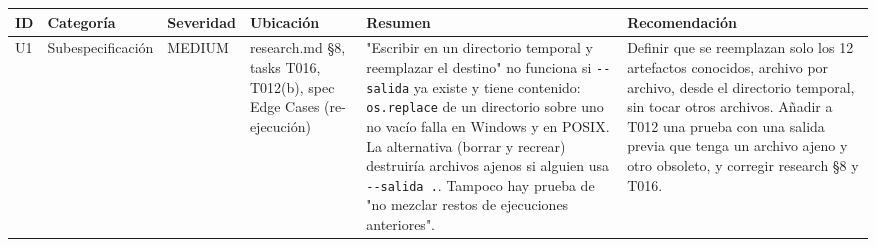 \documentclass[12pt,a4paper]{article}
\newcounter{none} %
\newenvironment{documentogenerado}[2]{%
  \def\doccomando{#1}\def\docruta{#2}%
  \par\begingroup\small\setstretch{1.15}\sloppy%
}{\endgroup\par\medskip}
\begin{document}
\begin{documentogenerado}{/speckit-analyze}{specs\slash 001-preparacion-datos\slash analisis-inicial.md}
{\def\LTcaptype{none} %
{\footnotesize
\begin{longtable}[]{@{}
  >{\raggedright\arraybackslash\hspace{0pt}}p{}
  >{\raggedright\arraybackslash\hspace{0pt}}p{}
  >{\raggedright\arraybackslash\hspace{0pt}}p{}
  >{\raggedright\arraybackslash\hspace{0pt}}p{}
  >{\raggedright\arraybackslash\hspace{0pt}}p{}
  >{\raggedright\arraybackslash\hspace{0pt}}p{}@{}}
\toprule\noalign{}
\begin{minipage}[b]{\linewidth}\raggedright
ID
\end{minipage} & \begin{minipage}[b]{\linewidth}\raggedright
Categoría
\end{minipage} & \begin{minipage}[b]{\linewidth}\raggedright
Severidad
\end{minipage} & \begin{minipage}[b]{\linewidth}\raggedright
Ubicación
\end{minipage} & \begin{minipage}[b]{\linewidth}\raggedright
Resumen
\end{minipage} & \begin{minipage}[b]{\linewidth}\raggedright
Recomendación
\end{minipage} \\
\midrule\noalign{}
\endhead
\bottomrule\noalign{}
\endlastfoot
U1 & Subespecificación & MEDIUM & research.md §8, tasks T016, T012(b), spec Edge Cases (re-ejecución) & "Escribir en un directorio temporal y reemplazar el destino" no funciona si \texttt{-\allowbreak{}\/\allowbreak{}-\allowbreak{}salida} ya existe y tiene contenido: \texttt{os.\allowbreak{}replace} de un directorio sobre uno no vacío falla en Windows y en POSIX. La alternativa (borrar y recrear) destruiría archivos ajenos si alguien usa \texttt{-\allowbreak{}\/\allowbreak{}-\allowbreak{}salida\ .}. Tampoco hay prueba de "no mezclar restos de ejecuciones anteriores". & Definir que se reemplazan solo los 12 artefactos conocidos, archivo por archivo, desde el directorio temporal, sin tocar otros archivos. Añadir a T012 una prueba con una salida previa que tenga un archivo ajeno y otro obsoleto, y corregir research §8 y T016. \\

\end{longtable}}}
\end{documentogenerado}
\end{document}
